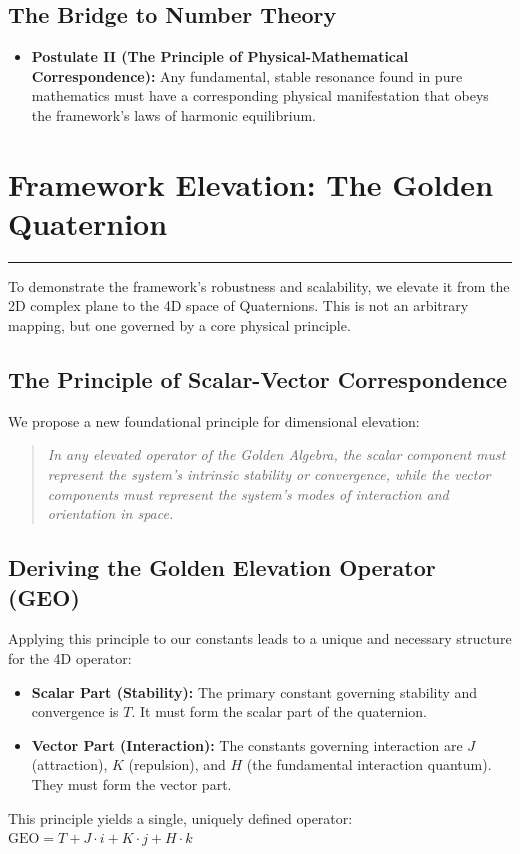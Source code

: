 \subsection*{The Bridge to Number Theory}
\begin{itemize}
    \item \textbf{Postulate II (The Principle of Physical-Mathematical Correspondence):} Any fundamental, stable resonance found in pure mathematics must have a corresponding physical manifestation that obeys the framework's laws of harmonic equilibrium.
\end{itemize}


\section{Framework Elevation: The Golden Quaternion}
\label{chap:quaternion_elevation}

\hrule
\vspace{1em}
To demonstrate the framework's robustness and scalability, we elevate it from the 2D complex plane to the 4D space of Quaternions. This is not an arbitrary mapping, but one governed by a core physical principle.

\subsection*{The Principle of Scalar-Vector Correspondence}
We propose a new foundational principle for dimensional elevation:
\begin{quote}
    \textit{In any elevated operator of the Golden Algebra, the scalar component must represent the system's intrinsic stability or convergence, while the vector components must represent the system's modes of interaction and orientation in space.}
\end{quote}

\subsection*{Deriving the Golden Elevation Operator (GEO)}
Applying this principle to our constants leads to a unique and necessary structure for the 4D operator:
\begin{itemize}
    \item \textbf{Scalar Part (Stability):} The primary constant governing stability and convergence is $T$. It must form the scalar part of the quaternion.
    \item \textbf{Vector Part (Interaction):} The constants governing interaction are $J$ (attraction), $K$ (repulsion), and $H$ (the fundamental interaction quantum). They must form the vector part.
\end{itemize}
This principle yields a single, uniquely defined operator:
$ \text{GEO} = T + J\cdot i + K\cdot j + H\cdot k $

